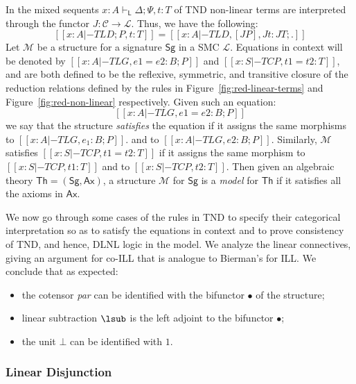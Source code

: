 In the mixed sequents $x:A \vdash_{\mathsf{L}} \Delta ; \Psi, t:T$ of TND non-linear terms are interpreted through the functor $J :
\mathcal{C} \rightarrow \mathcal{L}$. Thus, we have the following:
\[
  [[ x:A |-TL D ; P, t:T]]  = [[ x:A |-TL D, [ J P ] , J t : J T ; . ]]
\]  
Let $\mathcal{M}$ be a structure for a signature $\mathsf{Sg}$ in a
SMC $\mathcal{L}$. Equations in context will be denoted by $[[x: A
    |-TL G, e1 = e2 : B; P]]$ and $[[x: S |-TC P, t1 = t2 : T]]$, and
are both defined to be the reflexive, symmetric, and transitive
closure of the reduction relations defined by the rules in
Figure~\ref{fig:red-linear-terms} and Figure~\ref{fig:red-non-linear}
respectively.  Given such an equation:
$$
[[x: A |-TL G, e1 = e2 : B; P]]
$$
we say that the structure \emph{satisfies} the equation if it assigns the same morphisms to  
$[[x: A |-TL G, e_1 : B; P]]$.  and to $[[x : A |-TL G, e2 : B;P]]$.
Similarly, $\mathcal{M}$ satisfies $[[x: S |-TC P, t1 = t2 : T]]$ if it assigns the same morphism
to $[[x: S |-TC P, t1 : T]]$ and to $[[x: S |-TC P,  t2 : T]]$.
Then given an algebraic theory 
$\mathsf{Th} = (\mathsf{Sg}, \mathsf{Ax})$, a structure $\mathcal{M}$ for $\mathsf{Sg}$ is a {\em model} for $\mathsf{Th}$ if it satisfies all the 
axioms in $\mathsf{Ax}$. 

We now go through some cases of the rules in TND to specify their
categorical interpretation so as to satisfy the equations in context
and to prove consistency of TND, and hence, DLNL logic in the
model. We analyze the linear connectives, giving an
argument for co-ILL that is analogue to Bierman's for ILL. We conclude
that as expected:
\begin{itemize}
\item the cotensor \emph{par} can be identified with the bifunctor $\bullet$ of the structure; 
\item linear subtraction $\lsub$ is the left adjoint to the bifunctor $\bullet$; 
\item the unit $\bot$ can be identified with $1$.
\end{itemize}


\subsubsection{Linear Disjunction}\label{lindisj} 

